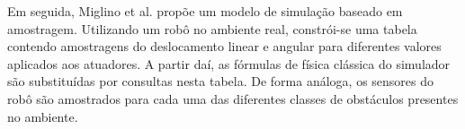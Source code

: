 Em seguida, Miglino et al. \cite{miglino96evolving} propõe um modelo de simulação baseado em amostragem. Utilizando um robô no ambiente real, constrói-se uma tabela contendo amostragens do deslocamento linear e angular para diferentes valores aplicados aos atuadores. A partir daí, as fórmulas de física clássica do simulador são substituídas por consultas nesta tabela. De forma análoga, os sensores do robô são amostrados para cada uma das diferentes classes de obstáculos presentes no ambiente.

